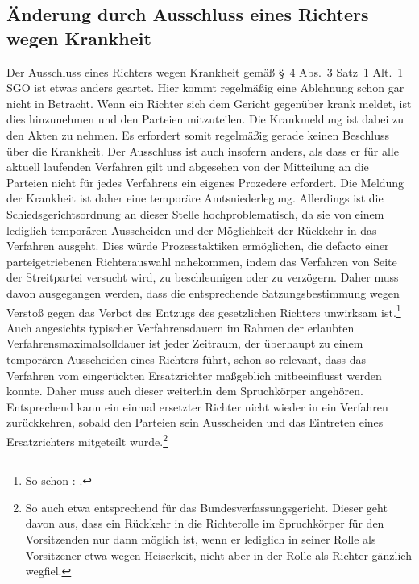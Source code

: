 \subsection{Änderung durch Ausschluss eines Richters wegen Krankheit}
\label{Zusammensetzung:Spruchkoerper:Krankheit}
Der Ausschluss eines Richters wegen Krankheit gemäß \S~4 Abs.~3 Satz~1 Alt.~1 SGO ist etwas anders geartet.
Hier kommt regelmäßig eine Ablehnung schon gar nicht in Betracht.
Wenn ein Richter sich dem Gericht gegenüber krank meldet, ist dies hinzunehmen und den Parteien mitzuteilen.
Die Krankmeldung ist dabei zu den Akten zu nehmen.
Es erfordert somit regelmäßig gerade keinen Beschluss über die Krankheit.
Der Ausschluss ist auch insofern anders, als dass er für alle aktuell laufenden Verfahren gilt und abgesehen von der Mitteilung an die Parteien nicht für jedes Verfahrens ein eigenes Prozedere erfordert.
Die Meldung der Krankheit ist daher eine temporäre Amtsniederlegung.
Allerdings ist die Schiedsgerichtsordnung an dieser Stelle hochproblematisch, da sie von einem lediglich temporären Ausscheiden und der Möglichkeit der Rückkehr in das Verfahren ausgeht.
Dies würde Prozesstaktiken ermöglichen, die defacto einer parteigetriebenen Richterauswahl nahekommen, indem das Verfahren von Seite der Streitpartei versucht wird, zu beschleunigen oder zu verzögern.
Daher muss davon ausgegangen werden, dass die entsprechende Satzungsbestimmung wegen Verstoß gegen das Verbot des Entzugs des gesetzlichen Richters unwirksam ist.\footnote{So schon \cite[299]{BVerfGE17294}: .}
Auch angesichts typischer Verfahrensdauern im Rahmen der erlaubten Verfahrensmaximalsolldauer ist jeder Zeitraum, der überhaupt zu einem temporären Ausscheiden eines Richters führt, schon so relevant, dass das Verfahren vom eingerückten Ersatzrichter maßgeblich mitbeeinflusst werden konnte.
Daher muss auch dieser weiterhin dem Spruchkörper angehören.
Entsprechend kann ein einmal ersetzter Richter nicht wieder in ein Verfahren zurückkehren, sobald den Parteien sein Ausscheiden und das Eintreten eines Ersatzrichters mitgeteilt wurde.\footnote{So auch etwa \cite[Eschelbach][\S~15 Rn~31]{BVerfGGMitarbeiterKommentar} entsprechend für das Bundesverfassungsgericht. Dieser geht davon aus, dass ein Rückkehr in die Richterolle im Spruchkörper für den Vorsitzenden nur dann möglich ist, wenn er lediglich in seiner Rolle als Vorsitzener etwa wegen Heiserkeit, nicht aber in der Rolle als Richter gänzlich wegfiel.}

